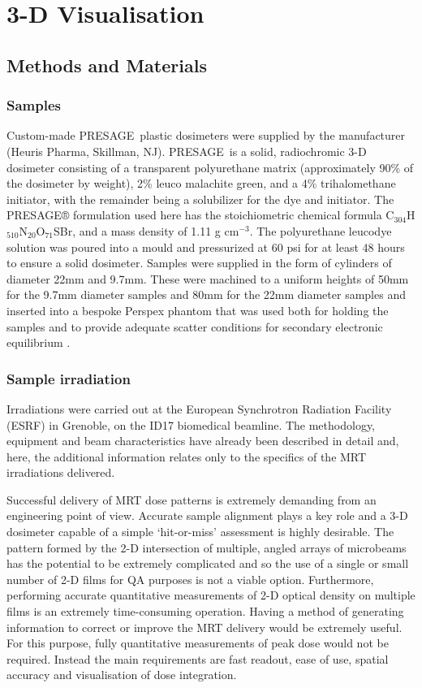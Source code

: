 \documentclass[12pt]{article}
\begin{document}
\section{3-D Visualisation}
\label{sec:3dvis}
\subsection{Methods and Materials}
\subsubsection{Samples}
Custom-made PRESAGE\textregistered \ plastic dosimeters were supplied by the manufacturer (Heuris Pharma, Skillman, NJ). PRESAGE\textregistered \ is a solid, radiochromic 3-D dosimeter consisting of a transparent polyurethane matrix (approximately 90\% of the dosimeter by weight), 2\% leuco malachite green, and a 4\% trihalomethane initiator, with the remainder being a solubilizer for the dye and initiator. The PRESAGE® formulation used here has the stoichiometric chemical formula C$_{304}$H$_{510}$N$_{20}$O$_{71}$SBr, and a mass density of 1.11 g cm$^{-3}$.  The polyurethane leucodye solution was poured into a mould and pressurized at 60 psi for at least 48 hours to ensure a solid dosimeter. Samples were supplied in the form of cylinders of diameter 22mm and 9.7mm. These were machined to a uniform heights of 50mm for the 9.7mm diameter samples and 80mm for the 22mm diameter samples and inserted into a bespoke Perspex phantom that was used both for holding the samples and to provide adequate scatter conditions for secondary electronic equilibrium \cite{doranestablishing2013}.

\subsubsection{Sample irradiation}
Irradiations were carried out at the European Synchrotron Radiation Facility (ESRF) in Grenoble, on the ID17 biomedical beamline. The methodology, equipment and beam characteristics have already been described in detail \cite{abdulrahmansophisticated2011 , doranestablishing2013 , doranan2010} and, here, the additional information relates only to the specifics of the MRT irradiations delivered. 

Successful delivery of MRT dose patterns is extremely demanding from an engineering point of view. Accurate sample alignment plays a key role and a 3-D dosimeter capable of a simple `hit-or-miss' assessment is highly desirable. The pattern formed by the 2-D intersection of multiple, angled arrays of microbeams has the potential to be extremely complicated and so the use of a single or small number of 2-D films for QA purposes is not a viable option. Furthermore, performing accurate quantitative measurements of 2-D optical density on multiple films is an extremely time-consuming operation. Having a method of generating information to correct or improve the MRT delivery would be extremely useful. For this purpose, fully quantitative measurements of peak dose would not be required. Instead the main requirements are fast readout, ease of use, spatial accuracy and visualisation of dose integration. 
\end{document}
